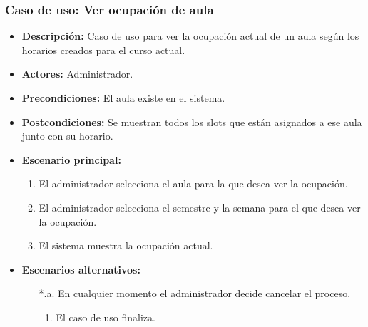 \documentclass{book}
\begin{document}
\subsubsection*{Caso de uso: Ver ocupación de aula}
\begin{itemize}
\item{\bf Descripción:} Caso de uso para ver la ocupación actual de un aula según los horarios creados para el curso actual.
\item{\bf Actores:} Administrador.
\item{\bf Precondiciones:} El aula existe en el sistema.
\item{\bf Postcondiciones:} Se muestran todos los slots que están asignados a ese aula junto con su horario.
\item{\bf Escenario principal:}
	\begin{enumerate}
	\item El administrador selecciona el aula para la que desea ver la ocupación.
	\item El administrador selecciona el semestre y la semana para el que desea ver la ocupación.
	\item El sistema muestra la ocupación actual.
	\end{enumerate}
\item{\bf Escenarios alternativos:}
	\begin{itemize}
		\item[*.a.] En cualquier momento el administrador decide cancelar el proceso.
		\begin{enumerate}
			\item El caso de uso finaliza.
		\end{enumerate}
	\end{itemize}
\end{itemize}

\pagebreak
\end{document}
